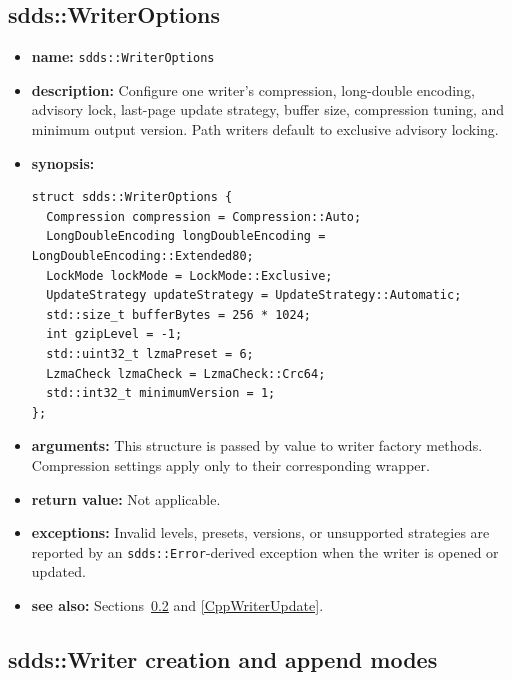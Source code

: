 \documentclass[11pt]{article}
\begin{document}
\subsection{sdds::WriterOptions}
\label{CppWriterOptions}

\begin{itemize}
\item {\bf name:}\newline
{\tt sdds::WriterOptions}
\item {\bf description:}\newline
Configure one writer's compression, long-double encoding, advisory lock,
last-page update strategy, buffer size, compression tuning, and minimum output
version.  Path writers default to exclusive advisory locking.
\item {\bf synopsis:}
\begin{verbatim}
struct sdds::WriterOptions {
  Compression compression = Compression::Auto;
  LongDoubleEncoding longDoubleEncoding = LongDoubleEncoding::Extended80;
  LockMode lockMode = LockMode::Exclusive;
  UpdateStrategy updateStrategy = UpdateStrategy::Automatic;
  std::size_t bufferBytes = 256 * 1024;
  int gzipLevel = -1;
  std::uint32_t lzmaPreset = 6;
  LzmaCheck lzmaCheck = LzmaCheck::Crc64;
  std::int32_t minimumVersion = 1;
};
\end{verbatim}
\item {\bf arguments:}\newline
This structure is passed by value to writer factory methods.  Compression
settings apply only to their corresponding wrapper.
\item {\bf return value:}\newline
Not applicable.
\item {\bf exceptions:}\newline
Invalid levels, presets, versions, or unsupported strategies are reported by
an {\tt sdds::Error}-derived exception when the writer is opened or updated.
\item {\bf see also:}\newline
Sections~\ref{CppWriterCreate} and \ref{CppWriterUpdate}.
\end{itemize}

\subsection{sdds::Writer creation and append modes}
\label{CppWriterCreate}
\end{document}

